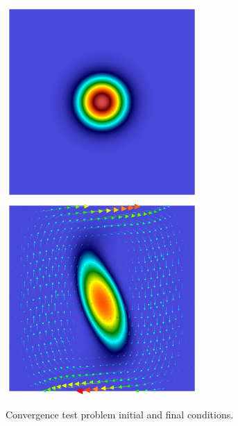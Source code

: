 \documentclass[final]{siamltex}
\begin{document}
\begin{figure}
\begin{center}
\includegraphics[width=2.9in]{gaussian_1}
\includegraphics[width=2.9in]{gaussian_2}
\caption{Convergence test problem initial and final conditions.}
\end{center}
\end{figure}
\end{document}

